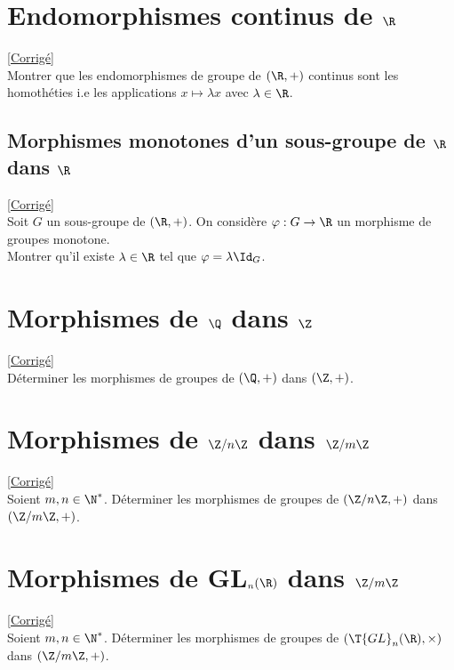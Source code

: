 \documentclass[8pt]{book}
\begin{document}
	\section{Endomorphismes continus de $\R$ }
	\label{Endomorphismes continus de R}
	\textcolor{blue}{\hyperref[Endomorphismes continus de R corrigé]{[Corrigé]}}\\
	Montrer que les endomorphismes de groupe de $(\R,+)$ continus sont les homothéties i.e les applications $x\mapsto \lambda x$ avec $\lambda \in \R$.
	
	\subsection{Morphismes monotones d'un sous-groupe de $\R$ dans $\R$ }
	\label{Morphismes monotones d'un sous-groupe de R dans R}
	\textcolor{blue}{\hyperref[Morphismes monotones d'un sous-groupe de R dans R corrigé]{[Corrigé]}}\\
	Soit $G$ un sous-groupe de $(\R,+)$. On considère $\varphi:G\to \R$ un morphisme de groupes monotone.\\
	Montrer qu'il existe $\lambda\in \R$ tel que $\varphi=\lambda\Id_G$.
	
	\section{Morphismes de $\Q$ dans $\Z$ }
	\label{Morphismes de Q dans Z}
	\textcolor{blue}{\hyperref[Morphismes de Q dans Z corrigé]{[Corrigé]}}\\
	Déterminer les morphismes de groupes de $(\Q,+)$ dans $(\Z,+)$.
	
	\section{Morphismes de $\Z/n\Z$ dans $\Z/m\Z$ }
	\label{Morphismes de Z/nZ dans Z/mZ}
	\textcolor{blue}{\hyperref[Morphismes de Z/nZ dans Z/mZ corrigé]{[Corrigé]}}\\
	Soient $m,n\in \N^*$. Déterminer les morphismes de groupes de $(\Z/n\Z,+)$ dans $(\Z/m\Z,+)$.
	
	\section{Morphismes de GL$_n(\R)$ dans $\Z/m\Z$ }
	\label{Morphismes de GLn(R) dans Z/mZ}
	\textcolor{blue}{\hyperref[Morphismes de GLn(R) dans Z/mZ corrigé]{[Corrigé]}}\\
	Soient $m,n \in \N^*$. Déterminer les morphismes de groupes de $(\T{GL}_n(\R),\times)$ dans $(\Z/m\Z,+)$.
	
\end{document}
